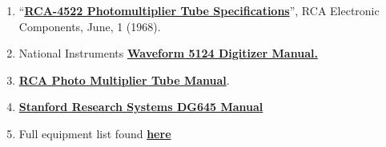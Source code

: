 \documentclass{../lab}
\begin{document}
\begin{enumerate}
    \item ``\href{https://drive.google.com/file/d/11fBl7c2Y8gVauK7lk-19jTY8A2UyLBjU/view?usp=drive_link}{\textbf{RCA-4522 Photomultiplier Tube Specifications}}'', RCA Electronic Components, June, 1 (1968).

    \item National Instruments \href{https://drive.google.com/file/d/1I44-O7KDUj7fn40Q_kS3U8oLBFfBRmvX/view?usp=drive_link}{\textbf{Waveform 5124 Digitizer Manual.}}

    \item \href{https://drive.google.com/file/d/1nuelDqhdO-MvjZOrWZEEvHxdeYYSY05h/view?usp=drive_link}{\textbf{RCA Photo Multiplier Tube Manual}}.

     \item \href{https://drive.google.com/file/d/1PNLeiZvP4k50RJv1V8cbh_L-T2n2zmKE/view?usp=drive_link}{\textbf{Stanford Research Systems DG645 Manual}}

\item Full equipment list found \href{https://drive.google.com/file/d/1oQm-7YrlH2wOCyylFPSlEtp4ftZeeN_S/view?usp=drive_link}{\textbf{here}}

\end{enumerate}
\end{document}
